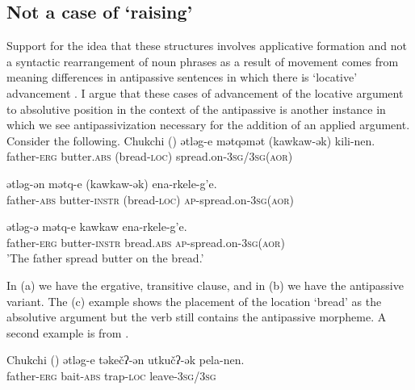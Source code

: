 \documentclass[output=paper,colorlinks,citecolor=brown,nonflat]{./langscibook}
\begin{document}
\subsection{Not a case of ‘raising’} %

Support for the idea that these structures involves applicative formation and not a syntactic rearrangement of noun phrases as a result of movement comes from meaning differences in antipassive sentences in which there is ‘locative’ advancement \citep{PolinskajaNedjalkov1987}. I argue that these cases of advancement of the locative argument to absolutive position in the context of the antipassive is another instance in which we see antipassivization necessary for the addition of an applied argument. Consider the following.
\ea Chukchi (\citealt{PolinskajaNedjalkov1987})   \label{ex:basilico:10}
	\ea \label{ex:basilico:10a}
	\gll ətləg-e  mətqəmət  (kawkaw-ək)  kili-nen.\\
	father-\textsc{{erg}}  butter.\textsc{{abs}}  (bread-\textsc{loc})   {spread.on}-3\textsc{sg}/3\textsc{sg}(\textsc{{aor}})\\
	\glt  

	\ex \label{ex:basilico:10b}
	\gll ətləg-ən  mətq-e  (kawkaw-ək)  ena-rkele-g’e.\\
	father-\textsc{{abs}}  butter-\textsc{{instr}}  (bread-\textsc{loc})  \textsc{ap}{}-{spread.on}-3\textsc{sg}(\textsc{{aor}})\\
	\glt 

	\ex \label{ex:basilico:10c}
	\gll  ətləg-ə  mətq-e  kawkaw  ena-rkele-g’e.\\
	father-\textsc{{erg}}  butter-\textsc{{instr}}  bread.\textsc{{abs}}  \textsc{ap}{}-{spread.on}-3\textsc{sg}(\textsc{{aor}})\\
	\glt 'The father spread butter on the bread.'
	\z
	\z

In (a) we have the ergative, transitive clause, and in (b) we have the antipassive variant. The (c) example shows the placement of the location ‘bread’ as the absolutive argument but the verb still contains the antipassive morpheme. A second example is from  \citet{KozinskyNedjalkovPolinskaja1988}.

\ea%
    Chukchi (\citealt{KozinskyNedjalkovPolinskaja1988}) \label{ex:basilico:11}
    \ea \label{ex:basilico:11a}
    \gll ətləg-e   təkečʔ-ən   utkučʔ-ək   pela-nen.\\
    father-\textsc{{erg}}   bait-\textsc{{abs}}   trap-\textsc{loc}   leave-3\textsc{sg}/3\textsc{sg}\\
    \glt  
    
\end{document}
